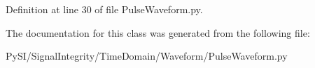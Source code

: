 Definition at line 30 of file Pulse\+Waveform.\+py.



The documentation for this class was generated from the following file\+:\begin{DoxyCompactItemize}
\item 
Py\+S\+I/\+Signal\+Integrity/\+Time\+Domain/\+Waveform/Pulse\+Waveform.\+py\end{DoxyCompactItemize}
